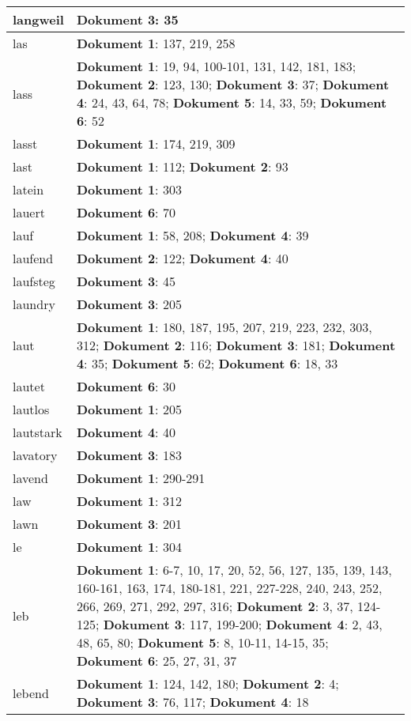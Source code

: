 \documentclass[a5paper]{article}
\begin{document}
\begin{longtable}[l]{|l|p{3in}|}
\hline
langweil & \textbf{Dokument 3}: 35 \\
\hline
las & \textbf{Dokument 1}: 137, 219, 258 \\
\hline
lass & \textbf{Dokument 1}: 19, 94, 100-101, 131, 142, 181, 183; \textbf{Dokument 2}: 123, 130; \textbf{Dokument 3}: 37; \textbf{Dokument 4}: 24, 43, 64, 78; \textbf{Dokument 5}: 14, 33, 59; \textbf{Dokument 6}: 52 \\
\hline
lasst & \textbf{Dokument 1}: 174, 219, 309 \\
\hline
last & \textbf{Dokument 1}: 112; \textbf{Dokument 2}: 93 \\
\hline
latein & \textbf{Dokument 1}: 303 \\
\hline
lauert & \textbf{Dokument 6}: 70 \\
\hline
lauf & \textbf{Dokument 1}: 58, 208; \textbf{Dokument 4}: 39 \\
\hline
laufend & \textbf{Dokument 2}: 122; \textbf{Dokument 4}: 40 \\
\hline
laufsteg & \textbf{Dokument 3}: 45 \\
\hline
laundry & \textbf{Dokument 3}: 205 \\
\hline
laut & \textbf{Dokument 1}: 180, 187, 195, 207, 219, 223, 232, 303, 312; \textbf{Dokument 2}: 116; \textbf{Dokument 3}: 181; \textbf{Dokument 4}: 35; \textbf{Dokument 5}: 62; \textbf{Dokument 6}: 18, 33 \\
\hline
lautet & \textbf{Dokument 6}: 30 \\
\hline
lautlos & \textbf{Dokument 1}: 205 \\
\hline
lautstark & \textbf{Dokument 4}: 40 \\
\hline
lavatory & \textbf{Dokument 3}: 183 \\
\hline
lavend & \textbf{Dokument 1}: 290-291 \\
\hline
law & \textbf{Dokument 1}: 312 \\
\hline
lawn & \textbf{Dokument 3}: 201 \\
\hline
le & \textbf{Dokument 1}: 304 \\
\hline
leb & \textbf{Dokument 1}: 6-7, 10, 17, 20, 52, 56, 127, 135, 139, 143, 160-161, 163, 174, 180-181, 221, 227-228, 240, 243, 252, 266, 269, 271, 292, 297, 316; \textbf{Dokument 2}: 3, 37, 124-125; \textbf{Dokument 3}: 117, 199-200; \textbf{Dokument 4}: 2, 43, 48, 65, 80; \textbf{Dokument 5}: 8, 10-11, 14-15, 35; \textbf{Dokument 6}: 25, 27, 31, 37 \\
\hline
lebend & \textbf{Dokument 1}: 124, 142, 180; \textbf{Dokument 2}: 4; \textbf{Dokument 3}: 76, 117; \textbf{Dokument 4}: 18 \\

\end{longtable}
\end{document}
